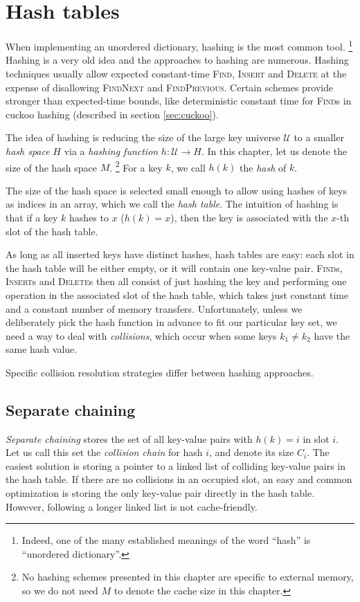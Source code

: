 \chapter{Hash tables}
\label{chapter:hashing}
When implementing an unordered dictionary, hashing is the most common tool.
\footnote{Indeed, one of the many established meanings of the word ``hash''
	is ``unordered dictionary''.}
Hashing is a very old idea and the approaches to hashing are numerous. Hashing
techniques usually allow expected constant-time \textsc{Find}, \textsc{Insert}
and \textsc{Delete} at the expense of disallowing \textsc{FindNext} and
\textsc{FindPrevious}. Certain schemes provide stronger than expected-time
bounds, like deterministic constant time for \textsc{Find}s in cuckoo hashing
(described in section \ref{sec:cuckoo}).

The idea of hashing is reducing the size of the large key universe
$\mathcal{U}$ to a smaller \emph{hash space} $H$ via a \emph{hashing function}
$h\mathop{:}\mathcal{U}\rightarrow H$.
In this chapter, let us denote the size of the hash space $M$.
\footnote{%
	No hashing schemes presented in this chapter are specific to external
	memory, so we do not need $M$ to denote the cache size in this chapter.
}
For a key $k$, we call $h(k)$ the \emph{hash} of $k$.

The size of the hash space is selected small enough to allow using hashes
of keys as indices in an array, which we call the \emph{hash table}.
The intuition of hashing is that if a key $k$ hashes to $x$ ($h(k)=x$), then
the key is associated with the $x$-th slot of the hash table.

As long as all inserted keys have distinct hashes, hash tables are easy:
each slot in the hash table will be either empty, or it will contain one
key-value pair. \textsc{Find}s, \textsc{Insert}s and \textsc{Delete}s then
all consist of just hashing the key and performing one operation in the
associated slot of the hash table, which takes just constant time and
a constant number of memory transfers.
Unfortunately, unless we deliberately pick the hash function in advance to fit
our particular key set, we need a way to deal with \emph{collisions},
which occur when some keys $k_1\neq k_2$ have the same hash value.

Specific collision resolution strategies differ between hashing approaches.

\section{Separate chaining}
\emph{Separate chaining} stores the set of all key-value pairs with
$h(k)=i$ in slot $i$. Let us call this set the \emph{collision chain} for hash
$i$, and denote its size $C_i$. The easiest solution is storing a pointer to
a linked list of colliding key-value pairs in the hash table. If there are no
collisions in an occupied slot, an easy and common optimization is storing
the only key-value pair directly in the hash table. However, following a longer
linked list is not cache-friendly.

